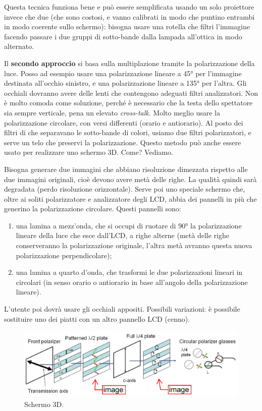 \documentclass[a4paper,11pt]{article}
\begin{document}
Questa tecnica funziona bene e può essere semplificata usando un solo proiettore invece che due (che sono costosi, e vanno calibrati in modo che puntino
entrambi in modo coerente sullo schermo): bisogna usare una rotella che filtri l'immagine facendo passare i due gruppi di sotto-bande dalla lampada all'ottica in modo alternato.
\par
Il \textbf{secondo approccio} si basa sulla multiplazione tramite la polarizzazione della luce. Posso ad esempio usare una polarizzazione lineare a 45° per l'immagine
destinata all'occhio sinistro, e una polarizzazione lineare a 135° per l'altra. Gli occhiali dovranno avere delle lenti che contengono adeguati filtri analizzatori. Non è molto
comoda come soluzione, perché è necessario che la testa dello spettatore sia sempre verticale, pena un elevato \textit{cross-talk}. Molto meglio usare la polarizzazione circolare, con versi differenti (orario e antiorario). Al posto dei filtri di che separavano le sotto-bande di colori, usiamo due
filtri polarizzatori, e serve un telo che preservi la polarizzazione. Questo metodo può anche essere usato per realizzare uno schermo 3D. Come? Vediamo.
\par
Bisogna generare due immagini che abbiano risoluzione dimezzata rispetto alle due immagini originali, cioè devono avere metà delle righe. La
qualità quindi sarà degradata (perdo risoluzione orizzontale). Serve poi uno speciale schermo che, oltre ai soliti polarizzatore e analizzatore degli LCD, abbia
dei pannelli in più che generino la polarizzazione circolare. Questi pannelli sono:
\begin{enumerate}
    \item una lamina a mezz'onda, che si occupi di ruotare di 90° la polarizzazione lineare della luce che esce dall'LCD, a righe alterne (metà delle righe conserveranno la polarizzazione
    originale, l'altra metà avranno questa nuova polarizzazione perpendicolare);
    \item una lamina a quarto d'onda, che trasformi le due polarizzazioni lineari in circolari (in senso orario o antiorario in base all'angolo della polarizzazione lineare).
\end{enumerate}
L'utente poi dovrà usare gli occhiali appositi.
Possibili variazioni: è possibile sostituire uno dei piatti con un altro pannello LCD (cenno).

\renewcommand{\thefigure}{4.29}
\begin{figure}[!h]
  \centering
    \includegraphics[scale=0.35]{images/4/3d_display.png}
    \caption{Schermo 3D.}
\end{figure}
\end{document}
